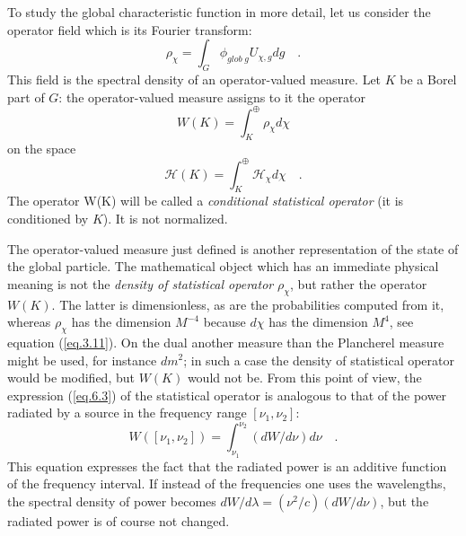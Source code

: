 \documentclass[a4paper,11pt]{article}
\def\Uc#1{U_{\chi,{#1}}}
\begin{document}
To study the global characteristic function in more detail, let us consider the operator field 
which is its Fourier transform:
\begin{equation}
 \label{eq.6.2}
    \rho_{\chi} = \int_G \phi_{glob \; g} \Uc{g} dg  \quad .
\end{equation}
This field is the spectral density of an operator-valued measure. Let $K$ be a Borel part of 
$G$: the operator-valued measure assigns to it the operator
\begin{equation}
 \label{eq.6.3}
    W(K) = \int_K^{\oplus} \rho_{\chi} d\chi
\end{equation}
on the space
\begin{equation}
 \label{eq.6.4}
    \mathcal{H}(K) = \int_K^{\oplus} \mathcal{H}_{\chi} d\chi   \quad .
\end{equation}
The operator W(K) will be called a {\it conditional statistical operator} (it is conditioned by 
$K$). It is not normalized. 

The operator-valued measure just defined is another representation of the state of the global 
particle. The mathematical object which has an immediate physical meaning is not the 
{\it density of statistical operator} $\rho_\chi$, but rather the operator $W(K)$. The latter 
is dimensionless, as are the 
probabilities computed from it, whereas $\rho_\chi$ has the dimension $M^{-4}$ because $d\chi$ 
has the dimension 
$M^4$, see equation (\ref{eq.3.11}). On the dual another measure than the Plancherel measure 
might be used, 
for instance $dm^2$; in such a case the density of statistical operator would be modified, but 
$W(K)$ would not be. From this point of view, the expression (\ref{eq.6.3}) of the statistical 
operator 
is analogous to that of the power radiated by a source in the frequency range $[\nu_1,\nu_2]$:
$$
   W([\nu_1,\nu_2]) =\int_{\nu_1}^{\nu_2}  (dW/d\nu) d\nu  \quad .
$$
This equation expresses the fact that the radiated power is an additive function of the 
frequency interval. If instead of the frequencies one uses the wavelengths, the spectral 
density of power becomes $dW/d\lambda = (\nu^2/c) (dW/d\nu)$, but the radiated power is of 
course not changed. 
\end{document}
